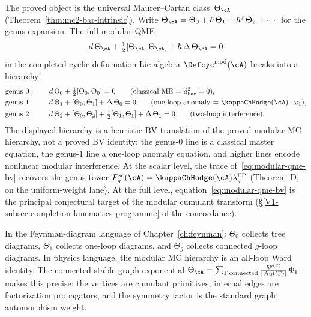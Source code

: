 \begin{remark}
\label{rem:modular-qme-bv}

The proved object is the universal Maurer--Cartan class~$\Theta_\cA$
\textup{(}Theorem~\ref{thm:mc2-bar-intrinsic}\textup{)}.
Write $\Theta_\cA = \Theta_0 + \hbar\,\Theta_1 + \hbar^2\,\Theta_2
+ \cdots$ for the genus expansion. The full modular QME
\begin{equation}\label{eq:modular-qme-bv}
d\,\Theta_\cA + \tfrac{1}{2}[\Theta_\cA, \Theta_\cA]
+ \hbar\,\Delta\,\Theta_\cA = 0
\end{equation}
in the completed cyclic deformation Lie algebra
$\Defcyc^{\mathrm{mod}}(\cA)$ breaks into a hierarchy:
\begin{alignat*}{2}
&\text{genus } 0\colon\quad
 &&d\,\Theta_0 + \tfrac{1}{2}[\Theta_0,\Theta_0] = 0
 \qquad\text{(classical ME $=$ $d_{\mathrm{bar}}^2 = 0$)}, \\
&\text{genus } 1\colon\quad
 &&d\,\Theta_1 + [\Theta_0,\Theta_1] + \Delta\,\Theta_0 = 0
 \qquad\text{(one-loop anomaly $=$ $\kappaChHodge(\cA)\cdot\omega_1$)}, \\
&\text{genus } 2\colon\quad
 &&d\,\Theta_2 + [\Theta_0,\Theta_2]
 + \tfrac{1}{2}[\Theta_1,\Theta_1]
 + \Delta\,\Theta_1 = 0
 \qquad\text{(two-loop interference)}.
\end{alignat*}
The displayed hierarchy is a heuristic BV translation of the proved
modular MC hierarchy, not a proved BV identity: the
genus-$0$ line is a classical master equation, the genus-$1$
line a one-loop anomaly equation, and higher lines encode
nonlinear modular interference. At the scalar level, the trace
of~\eqref{eq:modular-qme-bv} recovers the genus tower
$F_g^{\mathrm{sc}}(\cA)
=\kappaChHodge(\cA)\lambda_g^{\mathrm{FP}}$
\textup{(}Theorem~D, on the uniform-weight lane\textup{)}. At the
full level, equation~\eqref{eq:modular-qme-bv} is the principal
conjectural target of the modular cumulant transform
(\S\ref{V1-subsec:completion-kinematics-programme} of the concordance).

In the Feynman-diagram language of
Chapter~\ref{ch:feynman}: $\Theta_0$ collects tree
diagrams, $\Theta_1$ collects one-loop diagrams, and $\Theta_g$
collects connected $g$-loop diagrams. In physics language, the modular MC hierarchy is an all-loop Ward identity. The connected
stable-graph exponential
$\Theta_\cA = \sum_{\Gamma\,\text{connected}}
\frac{\hbar^{g(\Gamma)}}{|\operatorname{Aut}(\Gamma)|}\,\Phi_\Gamma$
makes this precise: the vertices are cumulant primitives, internal
edges are factorization propagators, and the symmetry factor is the
standard graph automorphism weight.
\end{remark}

